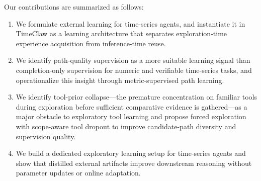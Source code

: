 Our contributions are summarized as follows:
\begin{enumerate}[leftmargin=*,itemsep=2pt]
    \item We formulate external learning for time-series agents, and instantiate it in TimeClaw as a learning architecture that separates exploration-time experience acquisition from inference-time reuse.
    \item We identify path-quality supervision as a more suitable learning signal than completion-only supervision for numeric and verifiable time-series tasks, and operationalize this insight through metric-supervised path learning.
    \item We identify tool-prior collapse---the premature concentration on familiar tools during exploration before sufficient comparative evidence is gathered---as a major obstacle to exploratory tool learning and propose forced exploration with scope-aware tool dropout to improve candidate-path diversity and supervision quality.
    \item We build a dedicated exploratory learning setup for time-series agents and show that distilled external artifacts improve downstream reasoning without parameter updates or online adaptation.
\end{enumerate}

